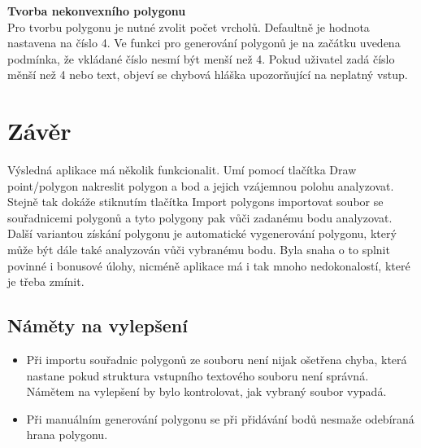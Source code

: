 \documentclass[a4paper,11pt,twoside]{article}
\begin{document}
\noindent\textbf{Tvorba nekonvexního polygonu}\\
Pro tvorbu polygonu je nutné zvolit počet vrcholů. Defaultně je hodnota nastavena na číslo 4. Ve funkci pro generování polygonů je na začátku uvedena podmínka, že vkládané číslo nesmí být menší než 4. Pokud uživatel zadá číslo měnší než 4 nebo text, objeví se chybová hláška upozorňující na neplatný vstup.


\newpage
{}

\vspace*{-1cm}
\section{Závěr}
\noindent
\large
Výsledná aplikace má několik funkcionalit. Umí pomocí tlačítka Draw point/polygon nakreslit polygon a bod a jejich vzájemnou polohu analyzovat. Stejně tak dokáže stiknutím tlačítka Import polygons importovat soubor se souřadnicemi polygonů a tyto polygony pak vůči zadanému bodu analyzovat. Další variantou získání polygonu je automatické vygenerování polygonu, který může být dále také analyzován vůči vybranému bodu. Byla snaha o to splnit povinné i bonusové úlohy, nicméně aplikace má i tak mnoho nedokonalostí, které je třeba zmínit.

\subsection{Náměty na vylepšení}
\large
\begin{itemize}
\item Při importu souřadnic polygonů ze souboru není nijak ošetřena chyba, která nastane pokud struktura vstupního textového souboru není správná. Námětem na vylepšení by bylo kontrolovat, jak vybraný soubor vypadá.

\item Při manuálním generování polygonu se při přidávání bodů nesmaže odebíraná hrana polygonu.
\end{itemize}

\newpage
\vspace*{-6ex}
\renewcommand{\refname}{Literatura} 
    
    
 
\end{document}

